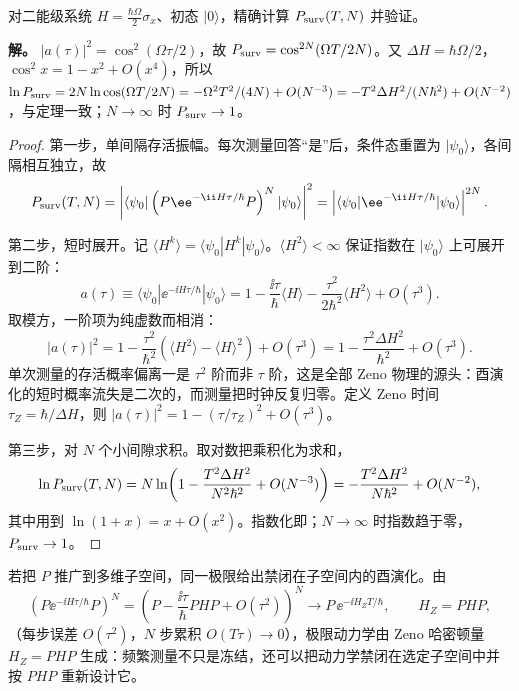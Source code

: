 \par
\begin{workedexample}
对二能级系统 \(H=\frac{\hbar\Omega}{2}\sigma_x\)、初态 \(|0\rangle\)，精确计算 \(P_{\rm surv}(T,N)\) 并验证。

\textbf{解。} \(|a(\tau)|^2=\cos^2(\Omega\tau/2)\)，故 \(P_{\rm surv}=\cos^{2N}(\Omega T/2N)\)。又 \(\Delta H=\hbar\Omega/2\)，\(\cos^2x=1-x^2+O(x^4)\)，所以 \(\ln P_{\rm surv}=2N\ln\cos(\Omega T/2N)=-\Omega^2T^2/(4N)+O(N^{-3})=-T^2\Delta H^2/(N\hbar^2)+O(N^{-2})\)，与定理一致；\(N\to\infty\) 时 \(P_{\rm surv}\to1\)。
\end{workedexample}
\par
\begin{proof}
第一步，单间隔存活振幅。每次测量回答“是”后，条件态重置为 \(|\psi_0\rangle\)，各间隔相互独立，故
\[
P_{\rm surv}(T,N)
=\left|\langle\psi_0|\left(P\ee^{-\ii H\tau/\hbar}P\right)^N|\psi_0\rangle\right|^2
=\left|\langle\psi_0|\ee^{-\ii H\tau/\hbar}|\psi_0\rangle\right|^{2N}.
\]

第二步，短时展开。记 \(\langle H^k\rangle=\langle\psi_0|H^k|\psi_0\rangle\)。\(\langle H^2\rangle<\infty\) 保证指数在 \(|\psi_0\rangle\) 上可展开到二阶：
\[
a(\tau)\equiv\langle\psi_0|\ee^{-\ii H\tau/\hbar}|\psi_0\rangle
=1-\frac{\ii\tau}{\hbar}\langle H\rangle-\frac{\tau^2}{2\hbar^2}\langle H^2\rangle+O(\tau^3).
\]
取模方，一阶项为纯虚数而相消：
\[
|a(\tau)|^2
=1-\frac{\tau^2}{\hbar^2}\left(\langle H^2\rangle-\langle H\rangle^2\right)+O(\tau^3)
=1-\frac{\tau^2\Delta H^2}{\hbar^2}+O(\tau^3).
\]
单次测量的存活概率偏离一是 \(\tau^2\) 阶而非 \(\tau\) 阶，这是全部 Zeno 物理的源头：酉演化的短时概率流失是二次的，而测量把时钟反复归零。定义 Zeno 时间 \(\tau_Z=\hbar/\Delta H\)，则 \(|a(\tau)|^2=1-(\tau/\tau_Z)^2+O(\tau^3)\)。

第三步，对 \(N\) 个小间隙求积。取对数把乘积化为求和，
\[
\ln P_{\rm surv}(T,N)
=N\ln\!\left(1-\frac{T^2\Delta H^2}{N^2\hbar^2}+O(N^{-3})\right)
=-\frac{T^2\Delta H^2}{N\hbar^2}+O(N^{-2}),
\]
其中用到 \(\ln(1+x)=x+O(x^2)\)。指数化即；\(N\to\infty\) 时指数趋于零，\(P_{\rm surv}\to1\)。
\end{proof}

若把 \(P\) 推广到多维子空间，同一极限给出禁闭在子空间内的酉演化。由
\[
\left(P\ee^{-\ii H\tau/\hbar}P\right)^N
=\left(P-\frac{\ii\tau}{\hbar}PHP+O(\tau^2)\right)^N
\longrightarrow P\,\ee^{-\ii H_ZT/\hbar},
\qquad H_Z=PHP,
\]
（每步误差 \(O(\tau^2)\)，\(N\) 步累积 \(O(T\tau)\to0\)），极限动力学由 Zeno 哈密顿量 \(H_Z=PHP\) 生成：频繁测量不只是冻结，还可以把动力学禁闭在选定子空间中并按 \(PHP\) 重新设计它。

